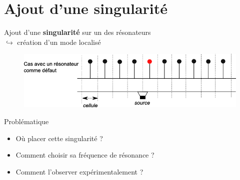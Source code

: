 \documentclass[12pt,xcolor=x11names,compress, notes=show]{beamer}%
\begin{document}
\section{Ajout d'une singularité}
\begin{frame}{\insertsectionhead}

	Ajout d'une \textbf{singularité} sur un des résonateurs\\
	  \hspace{1cm} $\hookrightarrow$ création d'un mode localisé \\
	\vspace{0.5cm}
\begin{figure}
\centering
\includegraphics[scale=0.45]{chgmt_defaut1.png}
\end{figure}

	\vspace{0.5cm}
	\begin{block}{Problématique}
		\begin{itemize}
			\item Où placer cette singularité ?
			\item Comment choisir sa fréquence de résonance ?
			\item Comment l'observer expérimentalement ?
		\end{itemize}
	\end{block}
 
\end{frame}
\end{document}
